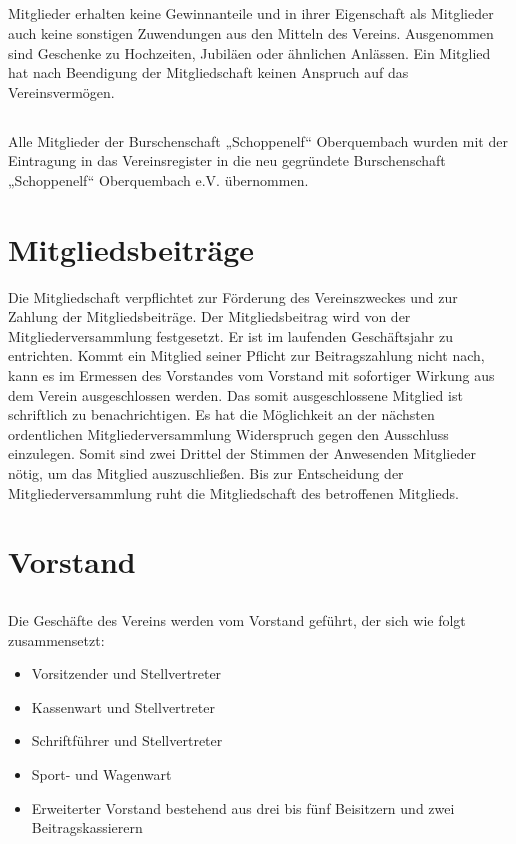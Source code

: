 	\subsection{} Mitglieder erhalten keine Gewinnanteile und in ihrer Eigenschaft als Mitglieder auch keine sonstigen Zuwendungen aus den Mitteln des Vereins. Ausgenommen sind Geschenke zu Hochzeiten, Jubiläen oder ähnlichen Anlässen. Ein Mitglied hat nach Beendigung der Mitgliedschaft keinen Anspruch auf das Vereinsvermögen. 
	
	\subsection{} Alle Mitglieder der Burschenschaft „Schoppenelf“ Oberquembach wurden mit der Eintragung in das Vereinsregister in die neu gegründete Burschenschaft „Schoppenelf“ Oberquembach e.V. übernommen.

\section{Mitgliedsbeiträge}	\label{8}
Die Mitgliedschaft verpflichtet zur Förderung des Vereinszweckes und zur Zahlung der Mitgliedsbeiträge. Der Mitgliedsbeitrag wird von der Mitgliederversammlung festgesetzt.
Er ist im laufenden Geschäftsjahr zu entrichten. Kommt ein Mitglied seiner Pflicht zur Beitragszahlung nicht nach, kann es im Ermessen des Vorstandes vom Vorstand mit sofortiger Wirkung aus dem Verein ausgeschlossen werden. Das somit ausgeschlossene Mitglied ist schriftlich zu benachrichtigen. Es hat die Möglichkeit an der nächsten ordentlichen Mitgliederversammlung Widerspruch gegen den Ausschluss einzulegen. Somit sind zwei Drittel der Stimmen der Anwesenden Mitglieder nötig, um das Mitglied auszuschließen. Bis zur Entscheidung der Mitgliederversammlung ruht die Mitgliedschaft des betroffenen Mitglieds. 

\section{Vorstand}
	\subsection {} Die Geschäfte des Vereins werden vom Vorstand geführt, der sich wie folgt zusammensetzt:
	\begin{itemize}
		\item Vorsitzender und Stellvertreter 
		\item Kassenwart und Stellvertreter
		\item Schriftführer und Stellvertreter 
		\item Sport- und Wagenwart
		\item Erweiterter Vorstand bestehend aus drei bis fünf Beisitzern und zwei Beitragskassierern  
	\end{itemize} 
	
